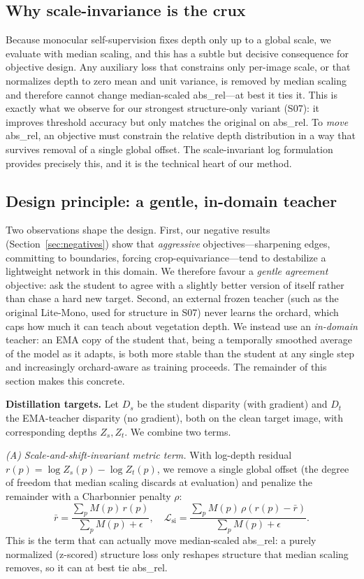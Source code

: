 \documentclass[conference]{IEEEtran}
\begin{document}
\subsection{Why scale-invariance is the crux}
Because monocular self-supervision fixes depth only up to a global scale, we evaluate
with median scaling, and this has a subtle but decisive consequence for objective
design. Any auxiliary loss that constrains only per-image scale, or that normalizes
depth to zero mean and unit variance, is removed by median scaling and therefore
cannot change median-scaled abs\_rel---at best it ties it. This is exactly what we
observe for our strongest structure-only variant (S07): it improves threshold accuracy
but only matches the original on abs\_rel. To \emph{move} abs\_rel, an objective must
constrain the relative depth distribution in a way that survives removal of a single
global offset. The scale-invariant log formulation~\cite{eigen2014depth} provides
precisely this, and it is the technical heart of our method.

\subsection{Design principle: a gentle, in-domain teacher}
Two observations shape the design. First, our negative results
(Section~\ref{sec:negatives}) show that \emph{aggressive} objectives---sharpening
edges, committing to boundaries, forcing crop-equivariance---tend to destabilize a
lightweight network in this domain. We therefore favour a \emph{gentle agreement}
objective: ask the student to agree with a slightly better version of itself rather
than chase a hard new target. Second, an external frozen teacher (such as the original
Lite-Mono, used for structure in S07) never learns the orchard, which caps how much it
can teach about vegetation depth. We instead use an \emph{in-domain} teacher: an EMA
copy of the student that, being a temporally smoothed average of the model as it
adapts, is both more stable than the student at any single step and increasingly
orchard-aware as training proceeds. The remainder of this section makes this concrete.

\textbf{Distillation targets.} Let $D_s$ be the student disparity (with
gradient) and $D_t$ the EMA-teacher disparity (no gradient), both on the clean
target image, with corresponding depths $Z_s,Z_t$. We combine two terms.

\emph{(A) Scale-and-shift-invariant metric term.} With log-depth residual
$r(p)=\log Z_s(p)-\log Z_t(p)$, we remove a single global offset (the
degree of freedom that median scaling discards at evaluation) and penalize the
remainder with a Charbonnier penalty $\rho$:
\begin{equation}
\bar{r}=\frac{\sum_p M(p)\,r(p)}{\sum_p M(p)+\epsilon},\quad
\mathcal{L}_{\text{si}}=\frac{\sum_p M(p)\,\rho\!\left(r(p)-\bar{r}\right)}{\sum_p M(p)+\epsilon}.
\end{equation}
This is the term that can actually move median-scaled abs\_rel: a purely
normalized (z-scored) structure loss only reshapes structure that median scaling
removes, so it can at best tie abs\_rel.
\end{document}
